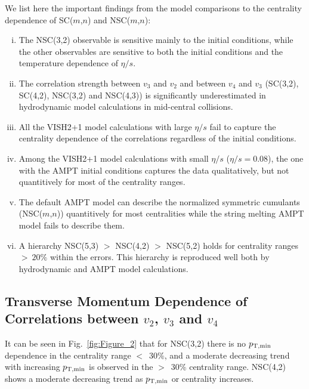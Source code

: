 We list here the important findings from the model comparisons to the centrality dependence of SC($m$,$n$) and NSC($m$,$n$):
\begin{enumerate}[(i)]
	\item The NSC(3,2) observable is sensitive mainly to the initial conditions, while the other observables are sensitive to both the initial conditions and the temperature dependence of $\eta/s$.
	\item The correlation strength between $v_3$ and $v_2$ and between $v_4$ and $v_3$ (SC(3,2), SC(4,2), NSC(3,2) and NSC(4,3)) is significantly underestimated in hydrodynamic model calculations in mid-central collisions.
	\item All the VISH2+1 model calculations with large $\eta/s$ fail to capture the centrality dependence of the correlations regardless of the initial conditions.
	\item Among the VISH2+1 model calculations with small $\eta/s$ ($\eta/s=0.08$), the one with the AMPT initial conditions captures the data qualitatively, but not quantitively for most of the centrality ranges.
	\item The default AMPT model can describe the normalized symmetric cumulants (NSC($m$,$n$)) quantitively for most centralities while the string melting AMPT model fails to describe them.
	\item A hierarchy NSC(5,3) $>$ NSC(4,2) $>$ NSC(5,2) holds for centrality ranges $>~20\%$ within the errors. This hierarchy is reproduced well both by hydrodynamic and AMPT model calculations.

\end{enumerate}


\subsection{Transverse Momentum Dependence of Correlations between $v_2$, $v_3$ and $v_4$}
\label{sec:ptdepsc}

It can be seen in Fig.~\ref{fig:Figure_2} that for NSC(3,2) there is no $p_{\rm T, min}$ dependence in the centrality range $<$~30\%, and a moderate decreasing trend with increasing $p_{\rm T, min}$ is observed in the $>$~30\% centrality range.
NSC(4,2) shows a moderate decreasing trend as $p_{\rm T, min}$ or centrality increases. 

